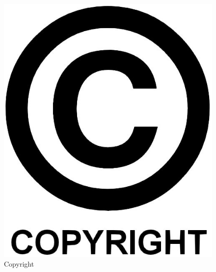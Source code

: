 \begin{figure}[!h]
	\centering
		\includegraphics[keepaspectratio=true,scale=0.4]{figuras/copyright}
	\caption{Copyright}
\end{figure}